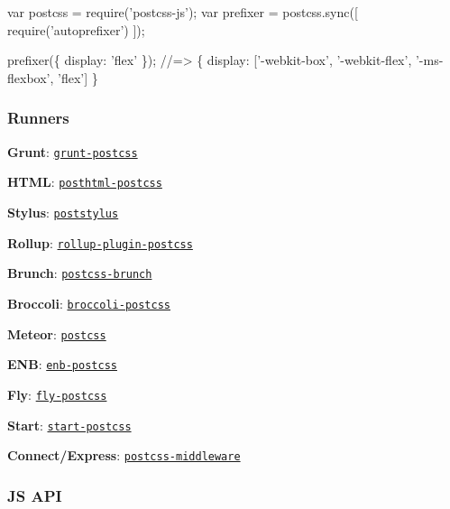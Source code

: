 \begin{DoxyCode}
var postcss  = require('postcss-js');
var prefixer = postcss.sync([ require('autoprefixer') ]);

prefixer(\{ display: 'flex' \}); //=> \{ display: ['-webkit-box', '-webkit-flex', '-ms-flexbox', 'flex'] \}
\end{DoxyCode}


\subsubsection*{Runners}


\begin{DoxyItemize}
\item {\bfseries Grunt}\+: \href{https://github.com/nDmitry/grunt-postcss}{\tt {\ttfamily grunt-\/postcss}}
\item {\bfseries H\+T\+ML}\+: \href{https://github.com/posthtml/posthtml-postcss}{\tt {\ttfamily posthtml-\/postcss}}
\item {\bfseries Stylus}\+: \href{https://github.com/seaneking/poststylus}{\tt {\ttfamily poststylus}}
\item {\bfseries Rollup}\+: \href{https://github.com/egoist/rollup-plugin-postcss}{\tt {\ttfamily rollup-\/plugin-\/postcss}}
\item {\bfseries Brunch}\+: \href{https://github.com/brunch/postcss-brunch}{\tt {\ttfamily postcss-\/brunch}}
\item {\bfseries Broccoli}\+: \href{https://github.com/jeffjewiss/broccoli-postcss}{\tt {\ttfamily broccoli-\/postcss}}
\item {\bfseries Meteor}\+: \href{https://atmospherejs.com/juliancwirko/postcss}{\tt {\ttfamily postcss}}
\item {\bfseries E\+NB}\+: \href{https://github.com/awinogradov/enb-postcss}{\tt {\ttfamily enb-\/postcss}}
\item {\bfseries Fly}\+: \href{https://github.com/postcss/fly-postcss}{\tt {\ttfamily fly-\/postcss}}
\item {\bfseries Start}\+: \href{https://github.com/start-runner/postcss}{\tt {\ttfamily start-\/postcss}}
\item {\bfseries Connect/\+Express}\+: \href{https://github.com/jedmao/postcss-middleware}{\tt {\ttfamily postcss-\/middleware}}
\end{DoxyItemize}

\subsubsection*{JS A\+PI}

